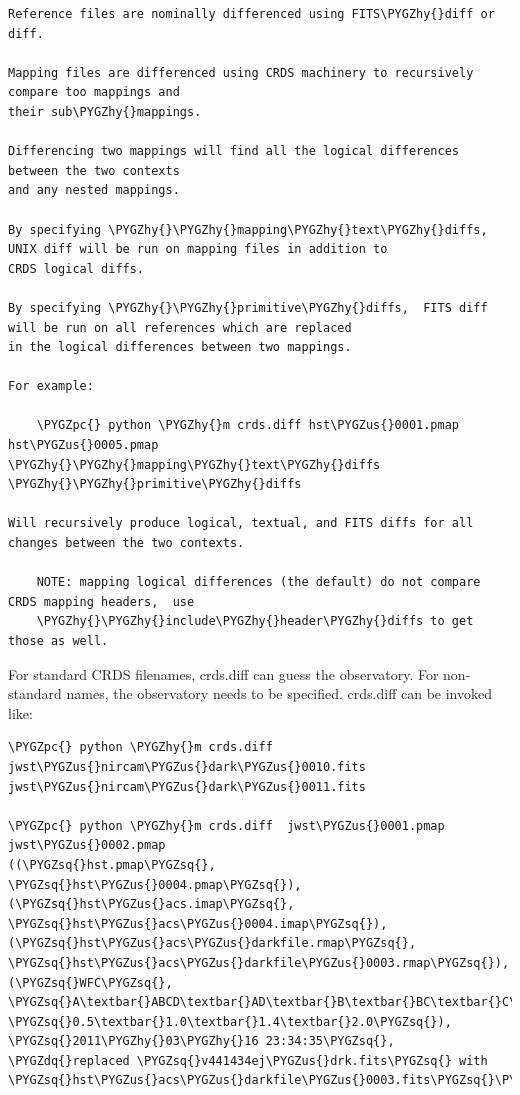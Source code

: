 \documentclass[letterpaper,10pt,english]{sphinxmanual}
\def\PYGZus{\char`\_}
\def\PYGZpc{\char`\%}
\def\PYGZhy{\char`\-}
\def\PYGZsq{\char`\'}
\def\PYGZdq{\char`\"}
\begin{document}
\begin{Verbatim}[commandchars=\\\{\}]
Reference files are nominally differenced using FITS\PYGZhy{}diff or diff.

Mapping files are differenced using CRDS machinery to recursively compare too mappings and
their sub\PYGZhy{}mappings.

Differencing two mappings will find all the logical differences between the two contexts
and any nested mappings.

By specifying \PYGZhy{}\PYGZhy{}mapping\PYGZhy{}text\PYGZhy{}diffs,  UNIX diff will be run on mapping files in addition to
CRDS logical diffs.

By specifying \PYGZhy{}\PYGZhy{}primitive\PYGZhy{}diffs,  FITS diff will be run on all references which are replaced
in the logical differences between two mappings.

For example:

    \PYGZpc{} python \PYGZhy{}m crds.diff hst\PYGZus{}0001.pmap  hst\PYGZus{}0005.pmap  \PYGZhy{}\PYGZhy{}mapping\PYGZhy{}text\PYGZhy{}diffs \PYGZhy{}\PYGZhy{}primitive\PYGZhy{}diffs

Will recursively produce logical, textual, and FITS diffs for all changes between the two contexts.

    NOTE: mapping logical differences (the default) do not compare CRDS mapping headers,  use
    \PYGZhy{}\PYGZhy{}include\PYGZhy{}header\PYGZhy{}diffs to get those as well.
\end{Verbatim}

For standard CRDS filenames,  crds.diff can guess the observatory.   For
non-standard names,  the observatory needs to be specified.  crds.diff can be
invoked like:

\begin{Verbatim}[commandchars=\\\{\}]
\PYGZpc{} python \PYGZhy{}m crds.diff   jwst\PYGZus{}nircam\PYGZus{}dark\PYGZus{}0010.fits  jwst\PYGZus{}nircam\PYGZus{}dark\PYGZus{}0011.fits

\PYGZpc{} python \PYGZhy{}m crds.diff  jwst\PYGZus{}0001.pmap   jwst\PYGZus{}0002.pmap
((\PYGZsq{}hst.pmap\PYGZsq{}, \PYGZsq{}hst\PYGZus{}0004.pmap\PYGZsq{}), (\PYGZsq{}hst\PYGZus{}acs.imap\PYGZsq{}, \PYGZsq{}hst\PYGZus{}acs\PYGZus{}0004.imap\PYGZsq{}), (\PYGZsq{}hst\PYGZus{}acs\PYGZus{}darkfile.rmap\PYGZsq{}, \PYGZsq{}hst\PYGZus{}acs\PYGZus{}darkfile\PYGZus{}0003.rmap\PYGZsq{}), (\PYGZsq{}WFC\PYGZsq{}, \PYGZsq{}A\textbar{}ABCD\textbar{}AD\textbar{}B\textbar{}BC\textbar{}C\textbar{}D\PYGZsq{}, \PYGZsq{}0.5\textbar{}1.0\textbar{}1.4\textbar{}2.0\PYGZsq{}), \PYGZsq{}2011\PYGZhy{}03\PYGZhy{}16 23:34:35\PYGZsq{}, \PYGZdq{}replaced \PYGZsq{}v441434ej\PYGZus{}drk.fits\PYGZsq{} with \PYGZsq{}hst\PYGZus{}acs\PYGZus{}darkfile\PYGZus{}0003.fits\PYGZsq{}\PYGZdq{})
\end{Verbatim}
\end{document}
